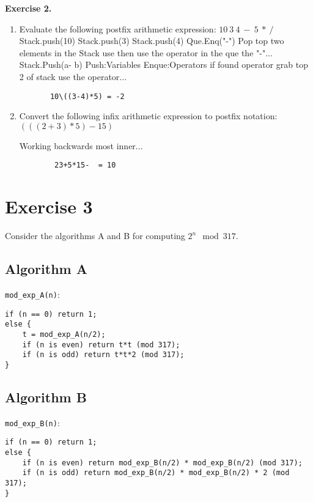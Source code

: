 \documentclass[11pt]{article}
\begin{document}
\bigskip

\textbf{Exercise 2.}  
\begin{enumerate}
\item Evaluate the following postfix arithmetic expression:  $10~3~4~-~5~*~/$
    \newline\newline Stack.push(10) Stack.push(3) Stack.push(4)
    \newline Que.Enq("-")
    \newline Pop top two elements in the Stack use then use the operator in the que the "-"...
    \newline Stack.Push(a- b)
    \newline Push:Variables Enque:Operators
    \newline if found operator grab top 2 of stack use the operator... 

    \begin{verbatim}
       10\((3-4)*5) = -2
    \end{verbatim}

\item Convert the following infix arithmetic expression to postfix notation: $(((2+3)*5)-15)$

    Working backwards most inner...
    \begin{verbatim}
        23+5*15-  = 10
    \end{verbatim}

\end{enumerate}

\bigskip

\section*{Exercise 3}

Consider the algorithms A and B for computing $2^n \mod 317$.

\subsection*{Algorithm A}
\texttt{mod\_exp\_A(n)}:
\begin{verbatim}
if (n == 0) return 1;
else {
    t = mod_exp_A(n/2);
    if (n is even) return t*t (mod 317);
    if (n is odd) return t*t*2 (mod 317);
}
\end{verbatim}

\subsection*{Algorithm B}
\texttt{mod\_exp\_B(n)}:
\begin{verbatim}
if (n == 0) return 1;
else {
    if (n is even) return mod_exp_B(n/2) * mod_exp_B(n/2) (mod 317);
    if (n is odd) return mod_exp_B(n/2) * mod_exp_B(n/2) * 2 (mod 317);
}
\end{verbatim}
\end{document}
